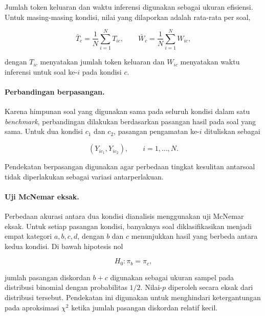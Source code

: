 Jumlah token keluaran dan waktu inferensi digunakan sebagai ukuran efisiensi.
Untuk masing-masing kondisi, nilai yang dilaporkan adalah rata-rata per soal,

\begin{equation}
    \bar{T}_c = \frac{1}{N}\sum_{i=1}^{N} T_{ic},
    \qquad
    \bar{W}_c = \frac{1}{N}\sum_{i=1}^{N} W_{ic},
    \label{eq:token-waktu}
\end{equation}

dengan $T_{ic}$ menyatakan jumlah token keluaran dan $W_{ic}$ menyatakan waktu
inferensi untuk soal ke-$i$ pada kondisi $c$.

\paragraph{Perbandingan berpasangan.}

Karena himpunan soal yang digunakan sama pada seluruh kondisi dalam satu
\textit{benchmark}, perbandingan dilakukan berdasarkan pasangan hasil pada
soal yang sama. Untuk dua kondisi $c_1$ dan $c_2$, pasangan pengamatan ke-$i$
dituliskan sebagai

\begin{equation}
    \left(Y_{ic_1},Y_{ic_2}\right),
    \qquad i=1,\ldots,N.
    \label{eq:pasangan-kinerja}
\end{equation}

Pendekatan berpasangan digunakan agar perbedaan tingkat kesulitan antarsoal
tidak diperlakukan sebagai variasi antarperlakuan.

\paragraph{Uji McNemar eksak.}

Perbedaan akurasi antara dua kondisi dianalisis menggunakan uji McNemar eksak.
Untuk setiap pasangan kondisi, banyaknya soal diklasifikasikan menjadi empat
kategori $a,b,c,d$, dengan $b$ dan $c$ menunjukkan hasil yang berbeda antara
kedua kondisi. Di bawah hipotesis nol

\begin{equation}
    H_0:\pi_b=\pi_c,
    \label{eq:h0-mcnemar-eksperimen}
\end{equation}

jumlah pasangan diskordan $b+c$ digunakan sebagai ukuran sampel pada distribusi
binomial dengan probabilitas $1/2$. Nilai-$p$ diperoleh secara eksak dari
distribusi tersebut. Pendekatan ini digunakan untuk menghindari ketergantungan
pada aproksimasi $\chi^2$ ketika jumlah pasangan diskordan relatif kecil.

